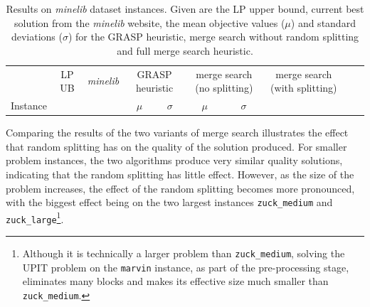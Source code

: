 \documentclass[authoryear,11pt,square,number,times,super,comma]{elsarticle}
\newcommand{\zuckmed}{\texttt{zuck\_medium}}
\newcommand{\zucklarge}{\texttt{zuck\_large}}
\newcommand{\marvin}{\texttt{marvin}}
\begin{document}
\begin{table}[h!]
\centering
\caption[Results on \emph{minelib} dataset instances]{Results on \emph{minelib} dataset instances. Given are the LP upper bound, current best solution from the \emph{minelib} website, the mean objective values (\(\mu\)) and standard deviations (\(\sigma\)) for the GRASP heuristic, merge search without random splitting and full merge search heuristic.%
}\label{tab:mine:main}
\begin{adjustbox}{width=\textwidth}
\begin{tabular}{lrrrrrrrrrr} \toprule
 & \multicolumn{1}{c}{LP UB} & \multicolumn{1}{c}{\emph{minelib}} & \multicolumn{2}{c}{GRASP heuristic} & \multicolumn{2}{c}{merge search (no splitting)} & \multicolumn{2}{c}{merge search (with splitting)}\\
\cmidrule(lr){2-2}\cmidrule(lr){3-3} \cmidrule(lr){4-5} \cmidrule(lr){6-7} \cmidrule(lr){8-9}
Instance & & & \multicolumn{1}{c}{\(\mu\)}&\multicolumn{1}{c}{\(\sigma\)} & \multicolumn{1}{c}{\(\mu\)}&\multicolumn{1}{c}{\(\sigma\)}  \\ \midrule
%

%
\bottomrule

\end{tabular}
\end{adjustbox}
\end{table}
Comparing the results of the two variants of merge search illustrates the effect that random splitting has on the quality of the solution produced. For smaller problem instances, the two algorithms produce very similar quality solutions, indicating that the random splitting has little effect. 
However, as the size of the problem increases, the effect of the random splitting becomes more pronounced, with the biggest effect being on the two largest instances \zuckmed{} and \zucklarge{}\footnote{Although it is technically a larger problem than \zuckmed, solving the UPIT problem on the \marvin{} instance, as part of the pre-processing stage, eliminates many blocks and makes its effective size much smaller than \zuckmed.}. 
\end{document}
